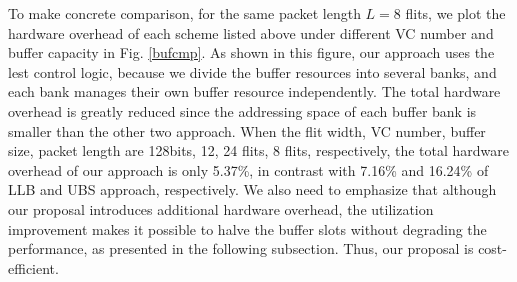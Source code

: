 \documentclass[10pt,conference]{IEEEtran}
\begin{document}
To make concrete comparison, for the same packet length $L=8$ flits, we plot the hardware overhead of each scheme listed above under different VC number and buffer capacity in Fig. \ref{bufcmp}. As shown in this figure, our approach uses the lest control logic, because we divide the buffer resources into several banks, and each bank manages their own buffer resource independently. The total hardware overhead is greatly reduced since the addressing space of each buffer bank is smaller than the other two approach. When the flit width, VC number, buffer size, packet length are 128bits, 12, 24 flits, 8 flits, respectively, the total hardware overhead of our approach is only 5.37\%, in contrast with 7.16\% and 16.24\% of LLB and UBS approach, respectively. We also need to emphasize that although our proposal introduces additional hardware overhead, the utilization improvement makes it possible to halve the buffer slots without degrading the performance, as presented in the following subsection. Thus, our proposal is cost-efficient.

\end{document}

